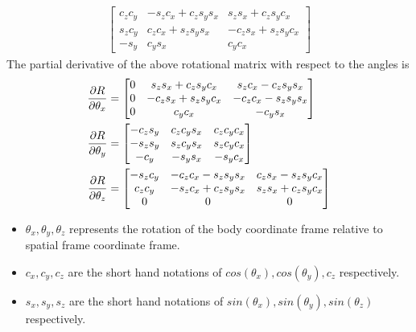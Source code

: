\begin{enumerate}
\begin{equation}
\begin{split}
		\begin{bmatrix}
		c_zc_y &-s_zc_x+c_zs_ys_x &s_zs_x+c_zs_yc_x\\
		s_zc_y &c_zc_x+s_zs_ys_x &-c_zs_x+s_zs_yc_x\\
		-s_y &c_ys_x &c_yc_x
		\end{bmatrix}
	\end{split}
\end{equation}
The partial derivative of the above rotational matrix with respect to the angles is
\begin{equation}
	\begin{split}	
		\frac{\partial {R}}{\partial {\theta_x}} &=
		\begin{bmatrix}
		0 &s_zs_x+c_zs_yc_x &s_zc_x-c_zs_ys_x \\
		0 &-c_zs_x+s_zs_yc_x &-c_zc_x-s_zs_ys_x \\
		0 &c_yc_x &-c_ys_x
		\end{bmatrix}\\
		\frac{\partial {R}}{\partial {\theta_y}} &=
		\begin{bmatrix}
		-c_zs_y &c_zc_ys_x &c_zc_yc_x \\
		-s_zs_y &s_zc_ys_x &s_zc_yc_x \\
		-c_y &-s_ys_x &-s_yc_x
		\end{bmatrix}\\
		\frac{\partial {R}}{\partial {\theta_z}} &=
		\begin{bmatrix}
		-s_zc_y &-c_zc_x-s_zs_ys_x &c_zs_x-s_zs_yc_x \\
		c_zc_y &-s_zc_x+c_zs_ys_x &s_zs_x+c_zs_yc_x\\
		0 &0 &0
		\end{bmatrix}
	\end{split}
\end{equation}
\begin{itemize}
\item $ \theta_x, \theta_y, \theta_z $ represents the rotation of the body coordinate frame relative to spatial frame coordinate frame.
\item $ c_x,c_y,c_z $ are the short hand notations of $cos(\theta_x), cos(\theta_y), c_z$ respectively.
\item $ s_x,s_y,s_z $ are the short hand notations of $sin(\theta_x), sin(\theta_y), sin(\theta_z)$ respectively.
\end{itemize}
\end{enumerate}
